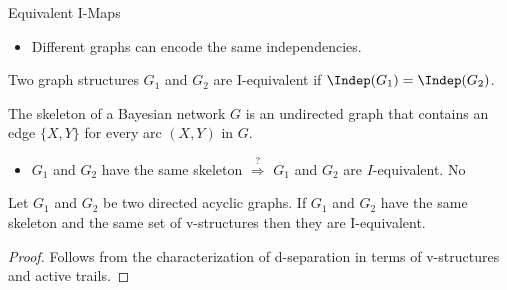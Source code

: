 \begin{frame}{Equivalent I-Maps}
\begin{itemize}
\item Different graphs can encode the same independencies.
\end{itemize}
\begin{center}
\hfill
{}
\hfill
{}
\end{center}
\pause
\begin{definition}[I-Equivalence]
    Two graph structures $G_1$ and $G_2$ are I-equivalent if $\Indep(G_1) = \Indep(G_2)$.
\end{definition}
\pause
\begin{definition}[Skeleton]
   The skeleton of a Bayesian network $G$  is an undirected graph that contains an edge $\{X,Y\}$ for every arc $(X,Y)$ in $G$.
\end{definition}
\pause
\begin{itemize}
    \item $G_1$ and $G_2$ have the same skeleton $\overset{?}{\Rightarrow}$ $G_1$ and $G_2$ are $I$-equivalent. \pause No
\end{itemize}
\pause
\begin{theorem}[I-Equivalence]
Let $G_1$ and $G_2$ be two directed acyclic graphs.
If $G_1$ and $G_2$ have the same skeleton and the same set of v-structures then they are I-equivalent.
\end{theorem}
\pause
\begin{proof}
    Follows from the characterization of d-separation in terms of v-structures and active trails.
\end{proof}
\end{frame}

